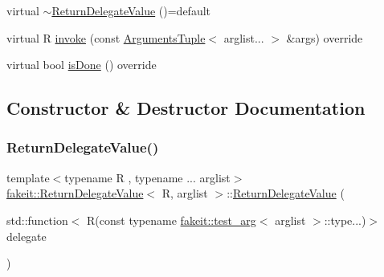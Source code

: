 \begin{DoxyCompactItemize}
\item 
virtual \mbox{\hyperlink{structfakeit_1_1ReturnDelegateValue_aa99d3b17fdae68f84cbc38c0acaee3c7}{$\sim$\+Return\+Delegate\+Value}} ()=default
\item 
virtual R \mbox{\hyperlink{structfakeit_1_1ReturnDelegateValue_a6f3758c13895d1fc748357f94983404a}{invoke}} (const \mbox{\hyperlink{namespacefakeit_a476a37a598825e1b5dd67b3a176491a1}{Arguments\+Tuple}}$<$ arglist... $>$ \&args) override
\item 
virtual bool \mbox{\hyperlink{structfakeit_1_1ReturnDelegateValue_ac6c33b7d5fff3fedeec91a4780924b84}{is\+Done}} () override
\end{DoxyCompactItemize}


\subsection{Constructor \& Destructor Documentation}
\mbox{\label{structfakeit_1_1ReturnDelegateValue_a889666c123cb4e75bee7771b9d9433a5}} 
\subsubsection{\texorpdfstring{ReturnDelegateValue()}{ReturnDelegateValue()}\hspace{0.1cm}{\footnotesize\ttfamily [1/9]}}
{\footnotesize\ttfamily template$<$typename R , typename ... arglist$>$ \\
\mbox{\hyperlink{structfakeit_1_1ReturnDelegateValue}{fakeit\+::\+Return\+Delegate\+Value}}$<$ R, arglist $>$\+::\mbox{\hyperlink{structfakeit_1_1ReturnDelegateValue}{Return\+Delegate\+Value}} (\begin{DoxyParamCaption}\item[{std\+::function$<$ R(const typename \mbox{\hyperlink{structfakeit_1_1test__arg}{fakeit\+::test\+\_\+arg}}$<$ arglist $>$\+::type...)$>$}]{delegate }\end{DoxyParamCaption})\hspace{0.3cm}{\ttfamily [inline]}}

\mbox{\label{structfakeit_1_1ReturnDelegateValue_aa99d3b17fdae68f84cbc38c0acaee3c7}} 
